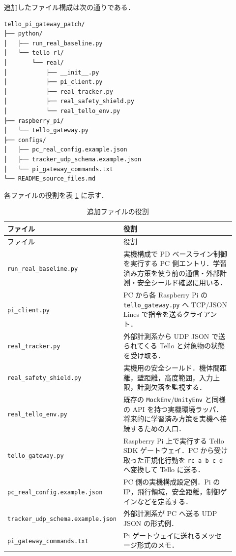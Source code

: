 追加したファイル構成は次の通りである．

\begin{lstlisting}
tello_pi_gateway_patch/
├── python/
│   ├── run_real_baseline.py
│   └── tello_rl/
│       └── real/
│           ├── __init__.py
│           ├── pi_client.py
│           ├── real_tracker.py
│           ├── real_safety_shield.py
│           └── real_tello_env.py
├── raspberry_pi/
│   └── tello_gateway.py
├── configs/
│   ├── pc_real_config.example.json
│   ├── tracker_udp_schema.example.json
│   └── pi_gateway_commands.txt
└── README_source_files.md
\end{lstlisting}

各ファイルの役割を表 \ref{tab:file_roles} に示す．

\begin{longtable}{p{0.32\linewidth}p{0.60\linewidth}}
\caption{追加ファイルの役割}\label{tab:file_roles}\\
\toprule
ファイル & 役割 \\
\midrule
\endfirsthead
\toprule
ファイル & 役割 \\
\midrule
\endhead
\bottomrule
\endfoot
\texttt{run\_real\_baseline.py} & 実機構成で PD ベースライン制御を実行する PC 側エントリ．学習済み方策を使う前の通信・外部計測・安全シールド確認に用いる． \\
\texttt{pi\_client.py} & PC から各 Raspberry Pi の \texttt{tello\_gateway.py} へ TCP/JSON Lines で指令を送るクライアント． \\
\texttt{real\_tracker.py} & 外部計測系から UDP JSON で送られてくる Tello と対象物の状態を受け取る． \\
\texttt{real\_safety\_shield.py} & 実機用の安全シールド．機体間距離，壁距離，高度範囲，入力上限，計測欠落を監視する． \\
\texttt{real\_tello\_env.py} & 既存の \texttt{MockEnv}/\texttt{UnityEnv} と同様の API を持つ実機環境ラッパ．将来的に学習済み方策を実機へ接続するための入口． \\
\texttt{tello\_gateway.py} & Raspberry Pi 上で実行する Tello SDK ゲートウェイ．PC から受け取った正規化行動を \texttt{rc a b c d} へ変換して Tello に送る． \\
\texttt{pc\_real\_config.example.json} & PC 側の実機構成設定例．Pi の IP，飛行領域，安全距離，制御ゲインなどを定義する． \\
\texttt{tracker\_udp\_schema.example.json} & 外部計測系が PC へ送る UDP JSON の形式例． \\
\texttt{pi\_gateway\_commands.txt} & Pi ゲートウェイに送れるメッセージ形式のメモ． \\
\end{longtable}

